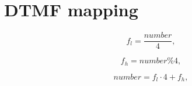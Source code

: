\chapter{DTMF mapping}\label{app:physical_encode}

\begin{equation}f_{l} = \frac{number}{4},\end{equation}

\begin{equation}f_{h} = number\%4,\end{equation}

\begin{equation}number = f_{l} \cdot 4 + f_{h},\end{equation}
